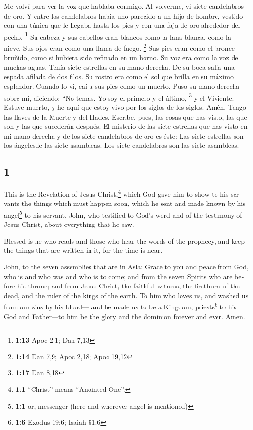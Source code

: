 \begin{paracol}{2}
 Me volví para ver la voz que hablaba conmigo. Al
volverme, vi siete candelabros de oro.  Y entre los
candelabros había uno parecido a un hijo de hombre, vestido con una
túnica que le llegaba hasta los pies y con una faja de oro alrededor del
pecho. \footnote{\textbf{1:13} Apoc 2,1; Dan 7,13}  Su
cabeza y sus cabellos eran blancos como la lana blanca, como la nieve.
Sus ojos eran como una llama de fuego. \footnote{\textbf{1:14} Dan 7,9;
  Apoc 2,18; Apoc 19,12}  Sus pies eran como el bronce
bruñido, como si hubiera sido refinado en un horno. Su voz era como la
voz de muchas aguas.  Tenía siete estrellas en su mano
derecha. De su boca salía una espada afilada de dos filos. Su rostro era
como el sol que brilla en su máximo esplendor.  Cuando lo
vi, caí a sus pies como un muerto. Puso su mano derecha sobre mí,
diciendo: ``No temas. Yo soy el primero y el último, \footnote{\textbf{1:17}
  Dan 8,18}  y el Viviente. Estuve muerto, y he aquí que
estoy vivo por los siglos de los siglos. Amén. Tengo las llaves de la
Muerte y del Hades.  Escribe, pues, las cosas que has
visto, las que son y las que sucederán después.  El
misterio de las siete estrellas que has visto en mi mano derecha y de
los siete candelabros de oro es éste: Las siete estrellas son los
ángelesde las siete asambleas. Los siete candelabros son las siete
asambleas.

\switchcolumn
\begin{otherlanguage}{english}

\hypertarget{section-1}{%
\section{1}\label{section-1}}

 This is the Revelation of Jesus Christ,\footnote{\textbf{1:1}
  ``Christ'' means ``Anointed One''.} which God gave him to show to his
servants the things which must happen soon, which he sent and made known
by his angel\footnote{\textbf{1:1} or, messenger (here and wherever
  angel is mentioned)} to his servant, John,  who
testified to God's word and of the testimony of Jesus Christ, about
everything that he saw.

 Blessed is he who reads and those who hear the words of
the prophecy, and keep the things that are written in it, for the time
is near.

 John, to the seven assemblies that are in Asia: Grace to
you and peace from God, who is and who was and who is to come; and from
the seven Spirits who are before his throne;  and from
Jesus Christ, the faithful witness, the firstborn of the dead, and the
ruler of the kings of the earth. To him who loves us, and washed us from
our sins by his blood---  and he made us to be a Kingdom,
priests\footnote{\textbf{1:6} Exodus 19:6; Isaiah 61:6} to his God and
Father---to him be the glory and the dominion forever and ever. Amen.


\end{otherlanguage}
\end{paracol}
